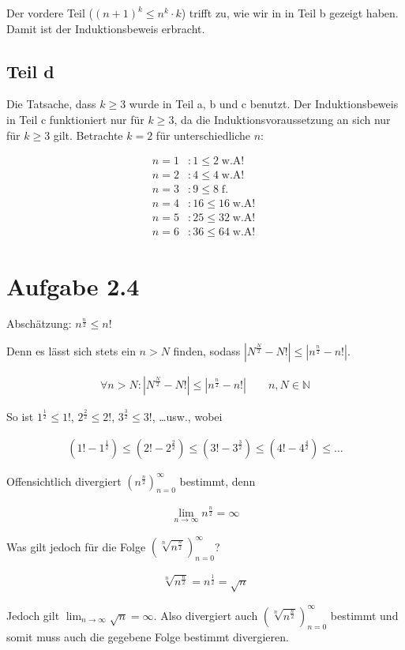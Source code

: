 \documentclass[a4paper,german,12pt,smallheadings]{scrartcl}
\begin{document}
Der vordere Teil ($(n+1)^k \le n^k \cdot k$) trifft zu, wie wir in in Teil b gezeigt haben. Damit ist der Induktionsbeweis erbracht.
\subsection*{Teil d}

Die Tatsache, dass $k \ge 3$ wurde in Teil a, b und c benutzt. Der Induktionsbeweis in Teil c funktioniert nur für $k \ge 3$, da die Induktionsvoraussetzung an sich nur für $k \ge 3$ gilt. Betrachte $k=2$ für unterschiedliche $n$:

\begin{align*}
  n=1&: 1 \le 2 \operatorname{w.A!}\\
  n=2&: 4 \le 4 \operatorname{w.A!}\\
  n=3&: 9 \le 8 \operatorname{f.}\\
  n=4&: 16 \le 16 \operatorname{w.A!}\\
  n=5&: 25 \le 32 \operatorname{w.A!}\\
  n=6&: 36 \le 64 \operatorname{w.A!}
\end{align*}

\section*{Aufgabe 2.4}
Abschätzung: $n^\frac{n}{2} \le n!$

Denn es lässt sich stets ein $n > N$ finden, sodass $|N^{\frac{N}{2}} - N!| \le
|n^\frac{n}{2} - n!|$.

\begin{align*}
  \forall n > N: |N^\frac{N}{2} - N!| \le |n^\frac{n}{2} - n!| \qquad n,N \in \mathbb{N}
\end{align*}

So ist $1^\frac{1}{2} \le 1!$, $2^{\frac{2}{2}} \le 2!$, $3^\frac{3}{2} \le 3!$, \dots usw., wobei

\begin{align*}
  (1! - 1^{\frac{1}{2}}) \le (2! - 2^{\frac{2}{2}}) \le (3! - 3^{\frac{3}{2}}) \le (4! - 4^{\frac{4}{2}}) \le \dots
\end{align*}

Offensichtlich divergiert $\left(n^\frac{n}{2}\right)_{n=0}^{\infty}$ bestimmt, denn

\begin{align*}
  \lim_{n \to \infty} n^\frac{n}{2} = \infty
\end{align*}

Was gilt jedoch für die Folge $\left( \sqrt[n]{n^\frac{n}{2}} \right)_{n=0}^{\infty}$?

\begin{align*}
  \sqrt[n]{n^{\frac{n}{2}}} = n^\frac{1}{2} = \sqrt{n}
\end{align*}

Jedoch gilt $\lim_{n \to \infty} \sqrt{n} = \infty$. Also divergiert auch
$\left( \sqrt[n]{n^{\frac{n}{2}}} \right)_{n=0}^{\infty}$ bestimmt und somit
muss auch die gegebene Folge bestimmt divergieren.
\end{document}
